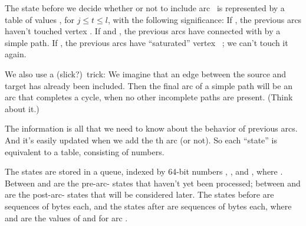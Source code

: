 The state before we decide whether or not to include arc~ is
represented by a table of values , for $j\le t\le l$,
with the following significance:
If , the previous arcs haven't touched vertex .
If  and , the previous arcs have
connected  with  by
a simple path.
If , the previous arcs have ``saturated'' vertex~%
; we can't
touch it again.

We also use a (slick?)\ trick: We imagine that an edge between the
source and target has already been included. Then the final arc of
a simple path will be an arc that completes a cycle, when no other
incomplete paths are present. (Think about it.)

The  information is all that we need to know about the behavior of
previous arcs. And it's easily updated when we add the th arc (or not).
So each ``state'' is equivalent to a  table, consisting of
 numbers.

The states are stored in a queue, indexed by 64-bit numbers
, , and , where .
Between  and  are the pre-arc- states
that haven't yet
been processed; between  and  are the post-arc-%
 states
that will be considered later. The states before 
are sequences of  bytes each, and the states after %
are sequences of  bytes each, where  and  are the values of
 and  for arc .

